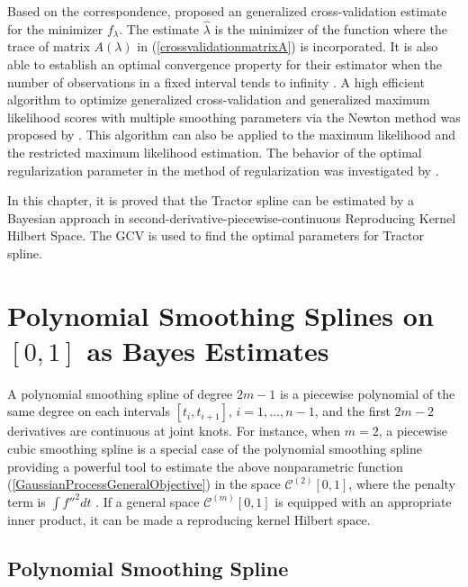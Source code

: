 Based on the correspondence, \cite{craven1978smoothing} proposed an generalized cross-validation estimate for the minimizer $f_\lambda$. The estimate $\hat{\lambda}$ is the minimizer of the function where the trace of matrix $A(\lambda)$ in (\ref{crossvalidationmatrixA}) is incorporated. It is also able to establish an optimal convergence property for their estimator when the number of observations in a fixed interval tends to infinity \cite{wecker1983signal}. A high efficient algorithm to optimize generalized cross-validation and generalized maximum likelihood scores with multiple smoothing parameters via the Newton method was proposed by \cite{gu1991minimizing}. This algorithm can also be applied to the maximum likelihood and the restricted maximum likelihood estimation. The behavior of the optimal regularization parameter in the method of regularization was investigated by \cite{wahba1990optimal}. 


In this chapter, it is proved that the Tractor spline can be estimated by a Bayesian approach in second-derivative-piecewise-continuous Reproducing Kernel Hilbert Space. The GCV is used to find the optimal parameters for Tractor spline. 



\section{Polynomial Smoothing Splines on $[0, 1]$ as Bayes Estimates}

A polynomial smoothing spline of degree $2m-1$ is a piecewise polynomial of the same degree on each intervals $[t_i,t_{i+1}]$, $i=1, \ldots, n-1$, and the first $2m-2$ derivatives are continuous at joint knots. For instance, when $m=2$,  a piecewise cubic smoothing spline is a special case of the polynomial smoothing spline providing a powerful tool to estimate the above nonparametric function (\ref{GaussianProcessGeneralObjective}) in the space  $\mathcal{C}^{(2)}[0,1]$, where the penalty term is $\int f''^2dt$ \cite{hastie1990generalized}  \cite{wang1998smoothing}. If a general space $\mathcal{C}^{(m)}[0,1]$ is equipped with an appropriate inner product, it can be made a reproducing kernel Hilbert space. 

\subsection{Polynomial Smoothing Spline}

